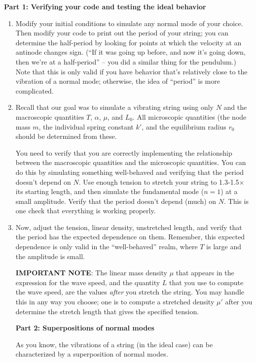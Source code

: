 \documentclass[12pt]{article}
\begin{document}
{\bf Part 1: Verifying your code and testing the ideal behavior}
\begin{enumerate}

\item{Modify your initial conditions to simulate any normal mode of your choice. Then modify your code to print out the period of your string; you can determine the half-period by looking for points at which the velocity at an
antinode changes sign. (``If it was going up before, and now it's going down, then we're at a half-period'' -- you did a similar thing for the pendulum.) Note that this is only valid if you have behavior that's relatively close to the vibration
of a normal mode; otherwise, the idea of ``period'' is more complicated.}

\item{Recall that our goal was to simulate a vibrating string using only $N$ and the macroscopic quantities $T$, $\alpha$, $\mu$, and $L_0$. All microscopic quantities (the node mass $m$, the individual spring constant $k'$, and the equilibrium radius $r_0$
  should be determined from these.

You need to verify that you are correctly implementing the relationship between the macroscopic quantities and the microscopic quantities. You can do this by simulating something well-behaved and verifying that
the period doesn't depend on $N$. Use enough tension to stretch your string to 1.3-1.5$\times$ its starting length, and then simulate the fundamental mode ($n=1$) at a small amplitude. Verify that the period doesn't depend (much) on $N$. This is one check that
everything is working properly.}


\item{Now, adjust the tension, linear density, unstretched length, and verify that the period has the expected dependence on them. Remember, this expected dependence is only valid in the ``well-behaved'' realm, where $T$ is large and the amplitude is small.}


{\bf IMPORTANT NOTE}: The linear mass density $\mu$ that appears in the expression for the wave speed, and the quantity $L$ that you use to compute the wave speed, are the values {\it after} you stretch the string. You may handle this in any way you choose;
one is to compute a stretched density {$\mu'$} after you determine the stretch length that gives the specified tension.
 

{\bf Part 2: Superpositions of normal modes}

As you know, the vibrations of a string (in the ideal case) can be characterized by a superposition of normal modes.


\end{enumerate}
\end{document}
